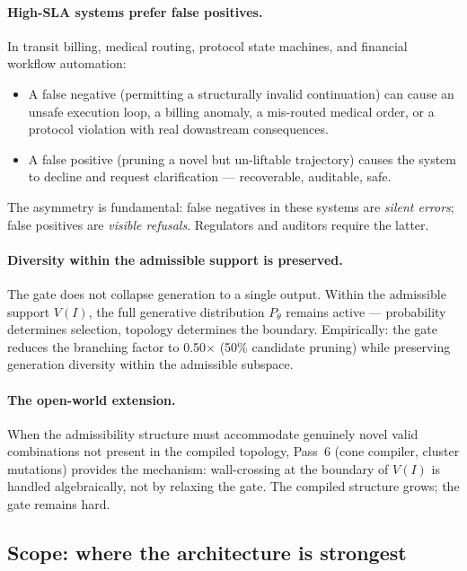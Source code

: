 \documentclass[11pt,a4paper]{article}
\begin{document}
\paragraph{High-SLA systems prefer false positives.}
In transit billing, medical routing, protocol state machines, and
financial workflow automation:
\begin{itemize}
  \item A false negative (permitting a structurally invalid continuation)
        can cause an unsafe execution loop, a billing anomaly, a
        mis-routed medical order, or a protocol violation with
        real downstream consequences.
  \item A false positive (pruning a novel but un-liftable trajectory)
        causes the system to decline and request clarification ---
        recoverable, auditable, safe.
\end{itemize}
The asymmetry is fundamental: false negatives in these systems are
\emph{silent errors}; false positives are \emph{visible refusals}.
Regulators and auditors require the latter.

\paragraph{Diversity within the admissible support is preserved.}
The gate does not collapse generation to a single output.
Within the admissible support $V(I)$, the full generative distribution
$P_\theta$ remains active --- probability determines selection,
topology determines the boundary.
Empirically: the gate reduces the branching factor to 0.50$\times$
(50\% candidate pruning) while preserving generation diversity within
the admissible subspace.

\paragraph{The open-world extension.}
When the admissibility structure must accommodate genuinely novel
valid combinations not present in the compiled topology, Pass~6
(cone compiler, cluster mutations) provides the mechanism:
wall-crossing at the boundary of $V(I)$ is handled algebraically,
not by relaxing the gate.
The compiled structure grows; the gate remains hard.

\subsection{Scope: where the architecture is strongest}
\end{document}
